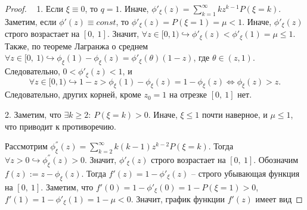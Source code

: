\begin{proof} ~
1. Если $\displaystyle \xi \equiv 0$, то $\displaystyle q=1$. Иначе, $\displaystyle \phi '_{\xi }( z) =\sum _{k=1}^{\infty } kz^{k-1} P( \xi =k)$. Заметим, если $\displaystyle \phi '( z) \equiv const$, то $\displaystyle \phi '_{\xi }( z) =P( \xi =1) =\mu < 1$. Иначе, $\displaystyle \phi '_{\xi }( z)$ строго возрастает на $\displaystyle [ 0,\ 1]$. Значит, $\displaystyle \forall z\in [ 0,1) \hookrightarrow \phi '_{\xi }( z) < \phi '_{\xi }( 1) =\mu \leqslant 1$. Также, по теореме Лагранжа о среднем $\displaystyle \forall z\in [ 0,\ 1) \hookrightarrow \phi _{\xi }( 1) -\phi _{\xi }( z) =\phi '_{\xi }( \theta )( 1-z)$, где $\displaystyle \theta \in ( z,1)$. Следовательно, $\displaystyle 0< \phi '_{\xi }( z) < 1$, и
\begin{equation*}
\forall z\in [ 0,1) \hookrightarrow 1-z >\phi _{\xi }( 1) -\phi _{\xi }( z) =1-\phi _{\xi }( z) \Leftrightarrow \phi _{\xi }( z)  >z.
\end{equation*}
Следовательно, других корней, кроме $\displaystyle z_{0} =1$ на отрезке $\displaystyle [ 0,\ 1]$ нет.

2. Заметим, что $\displaystyle \exists k\geqslant 2:\ P( \xi =k)  >0$. Иначе, $\displaystyle \xi \leqslant 1$ почти наверное, и $\displaystyle \mu \leqslant 1$, что приводит к противоречию.

Рассмотрим $\displaystyle \phi _{\xi }^{''}( z) =\sum _{k=2}^{\infty } k( k-1) z^{k-2} P( \xi =k)$. Тогда $\displaystyle \forall z >0\hookrightarrow \phi _{\xi }^{''}( z)  >0$. Значит, $\displaystyle \phi '_{\xi }( z)$ строго возрастает на $\displaystyle [ 0,\ 1]$. Обозначим $\displaystyle f( z) :=z-\phi _{\xi }( z)$. Тогда $\displaystyle f'( z) =1-\phi '_{\xi }( z)$ -- строго убывающая функция на $\displaystyle [ 0,\ 1]$. Заметим, что $\displaystyle f'( 0) =1-\phi '_{\xi }( 0) =1-P( \xi =1)  >0$, $\displaystyle f'( 1) =1-\phi '_{\xi }( 1) =1-\mu < 0$. Значит, график функции $\displaystyle f'( z)$ имеет вид


\end{proof}
